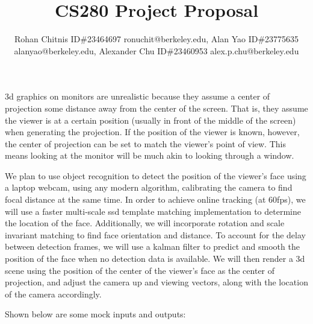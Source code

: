 \documentclass[11pt]{article}
\title{\vspace{-8ex} CS280 Project Proposal \vspace{-8ex}}
\date{}
\begin{document}
\maketitle

\begin{center}
\author{Rohan Chitnis ID\#23464697 ronuchit@berkeley.edu, Alan Yao ID\#23775635 alanyao@berkeley.edu, Alexander Chu ID\#23460953 alex.p.chu@berkeley.edu}
\end{center}

3d graphics on monitors are unrealistic because they assume a center of projection some distance away from the center of the screen. That is, they assume the viewer is at a certain position (usually in front of the middle of the screen) when generating the projection. If the position of the viewer is known, however, the center of projection can be set to match the viewer's point of view. This means looking at the monitor will be much akin to looking through a window. 

We plan to use object recognition to detect the position of the viewer's face using a laptop webcam, using any modern algorithm, calibrating the camera to find focal distance at the same time. In order to achieve online tracking (at 60fps), we will use a faster multi-scale ssd template matching implementation to determine the location of the face. Additionally, we will incorporate rotation and scale invariant matching to find face orientation and distance. To account for the delay between detection frames, we will use a kalman filter to predict and smooth the position of the face when no detection data is available. We will then render a 3d scene using the position of the center of the viewer's face as the center of projection, and adjust the camera up and viewing vectors, along with the location of the camera accordingly.

Shown below are some mock inputs and outputs:
\end{document}
